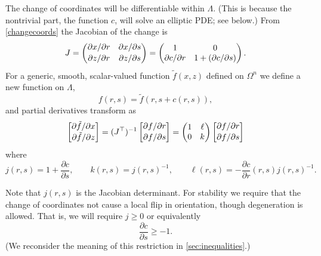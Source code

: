 \documentclass[letterpaper,final,12pt,reqno]{amsart}
\begin{document}
The change of coordinates will be differentiable within $\Lambda$.  (This is because the nontrivial part, the function $c$, will solve an elliptic PDE; see below.)  From \eqref{changecoords} the Jacobian of the change is
\begin{equation}
J = \begin{pmatrix} \partial x / \partial r & \partial x / \partial s \\ {\large\strut} \partial z / \partial r & \partial z / \partial s \end{pmatrix} = \begin{pmatrix} 1 & 0 \\ \partial c/\partial r & 1+(\partial c/\partial s) \end{pmatrix}. \label{jacchange}
\end{equation}
For a generic, smooth, scalar-valued function $\tilde f(x,z)$ defined on $\Omega^n$ we define a new function on $\Lambda$,
    $$f(r,s) = \tilde f(r,s+c(r,s)),$$
and partial derivatives transform as
\begin{equation}
\begin{bmatrix} \partial \tilde f / \partial x \\ {\large\strut} \partial \tilde f / \partial z\end{bmatrix} = (J^\top)^{-1} \begin{bmatrix} \partial f / \partial r \\ {\large\strut} \partial f / \partial s\end{bmatrix} = \begin{pmatrix} 1 & \ell \\ 0 & k \end{pmatrix} \begin{bmatrix} \partial f / \partial r \\ {\large\strut} \partial f / \partial s\end{bmatrix} \label{changederivatives}
\end{equation}
where
\begin{equation}
j(r,s) = 1+\frac{\partial c}{\partial s}, \qquad k(r,s) = j(r,s)^{-1}, \qquad \ell(r,s) = - \frac{\partial c}{\partial r}(r,s) j(r,s)^{-1}. \label{definejkl}
\end{equation}

Note that $j(r,s)$ is the Jacobian determinant.  For stability we require that the change of coordinates not cause a local flip in orientation, though degeneration is allowed.  That is, we will require $j\ge 0$ or equivalently
\begin{equation}
\frac{\partial c}{\partial s} \ge -1. \label{differentialVI}
\end{equation}
(We reconsider the meaning of this restriction in \ref{sec:inequalities}.)
\end{document}
